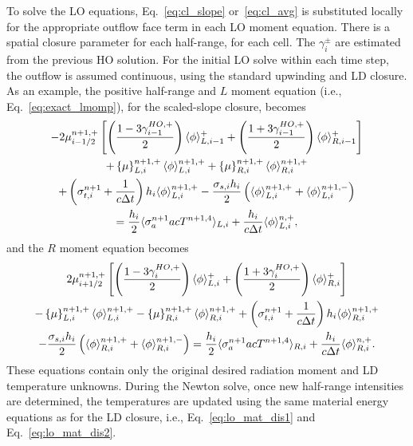 To solve the LO equations, Eq.~\eqref{eq:cl_slope} or~\eqref{eq:cl_avg} is substituted
locally for
the appropriate outflow face term in each LO moment equation. There is a spatial closure parameter for each
half-range, for each cell.
 The $\gamma_i^\pm$ are
estimated from the previous HO solution. For the initial LO solve within each
time step, the outflow is assumed continuous, using the standard upwinding and LD closure.  
As an example, the positive half-range and $L$ moment equation (i.e.,
Eq.~\eqref{eq:exact_lmomp}), for the scaled-slope closure, becomes
\begin{multline}
    -2{\mu}_{i-1/2}^{n+1,+} \left[\left(\frac{\displaystyle 1 - 3 \gamma_{i-1}^{HO,+}}{\displaystyle 2 }  \right)
        \langle \phi \rangle_{L,i-1}^+ + \left(\frac{\displaystyle 1 + 3 \gamma_{i-1}^{HO,+}}{\displaystyle 2 }  \right)
    \langle \phi \rangle_{R,i-1}^+
    \right] \\ + \left\{ \mu \right\}_{L,i}^{n+1,+}
  \langle \phi \rangle_{L,i}^{n+1,+}
  +  \left\{ \mu \right\}_{R,i}^{n+1,+}
  \langle \phi \rangle_{R,i}^{n+1,+}\\ +  \left(\sigma_{t,i}^{n+1}+\frac{1}{c \Delta t} \right) h_i 
  \langle \phi \rangle_{L,i}^{n+1,+} -  \frac{\sigma_{s,i} h_i}{2} \left( \langle \phi \rangle_{L,i}^{n+1,+} +
  \langle \phi \rangle_{L,i}^{n+1,-}\right)\\  = \frac{h_i}{2} \langle \sigma_a^{n+1} a c T^{n+1,4} \rangle_{L,i} +
  \frac{h_i}{c\Delta t}\langle \phi \rangle_{L,i}^{n,+},
    \label{eqn:clsd_posl}
\end{multline}
and the $R$ moment equation becomes
\begin{multline}
    2{\mu}_{i+1/2}^{n+1,+} \left[
    \left(\frac{\displaystyle 1 - 3 \gamma_{i}^{HO,+}}{\displaystyle 2 }  \right)
        \langle \phi \rangle_{L,i}^+ + \left(\frac{\displaystyle 1 + 3 \gamma_{i}^{HO,+}}{\displaystyle 2 }  \right)
    \langle \phi \rangle_{R,i}^+
    \right]  \\ 
    - \left\{ \mu \right\}_{L,i}^{n+1,+}
  \langle \phi \rangle_{L,i}^{n+1,+}
  -  \left\{ \mu \right\}_{R,i}^{n+1,+}
  \langle \phi \rangle_{R,i}^{n+1,+} +  \left(\sigma_{t,i}^{n+1}+\frac{1}{c \Delta t} \right) h_i 
  \langle \phi \rangle_{R,i}^{n+1,+} \\-  \frac{\sigma_{s,i} h_i}{2} \left( \langle \phi \rangle_{R,i}^{n+1,+} +
  \langle \phi \rangle_{R,i}^{n+1,-}\right) = \frac{h_i}{2} \langle \sigma_a^{n+1} a c T^{n+1,4} \rangle_{R,i} +
  \frac{h_i}{c\Delta t}\langle \phi \rangle_{R,i}^{n,+}.
    \label{eqn:clsd_posr}
\end{multline}
These equations contain only the original desired radiation moment and LD temperature unknowns.
During the Newton solve, once new half-range
intensities are determined, the temperatures are updated using the same material
energy equations as for the LD closure, i.e., Eq.~\eqref{eq:lo_mat_dis1} and Eq.~\eqref{eq:lo_mat_dis2}.

